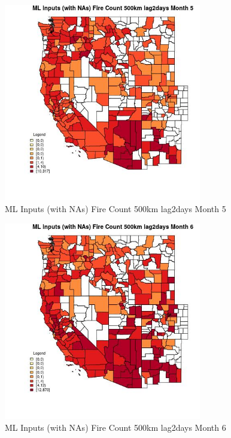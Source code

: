 \begin{figure} 
\centering  
\includegraphics[width=0.77\textwidth]{Code_Outputs/Report_ML_input_PM25_Step4_part_e_de_duplicated_aves_compiled_2019-05-21wNAs_CountyFire_Count_500km_lag2daysmedianMonth5.jpg} 
\caption{\label{fig:Report_ML_input_PM25_Step4_part_e_de_duplicated_aves_compiled_2019-05-21wNAsCountyFire_Count_500km_lag2daysmedianMonth5}ML Inputs (with NAs) Fire Count 500km lag2days Month 5} 
\end{figure} 
 

\begin{figure} 
\centering  
\includegraphics[width=0.77\textwidth]{Code_Outputs/Report_ML_input_PM25_Step4_part_e_de_duplicated_aves_compiled_2019-05-21wNAs_CountyFire_Count_500km_lag2daysmedianMonth6.jpg} 
\caption{\label{fig:Report_ML_input_PM25_Step4_part_e_de_duplicated_aves_compiled_2019-05-21wNAsCountyFire_Count_500km_lag2daysmedianMonth6}ML Inputs (with NAs) Fire Count 500km lag2days Month 6} 
\end{figure} 
 

